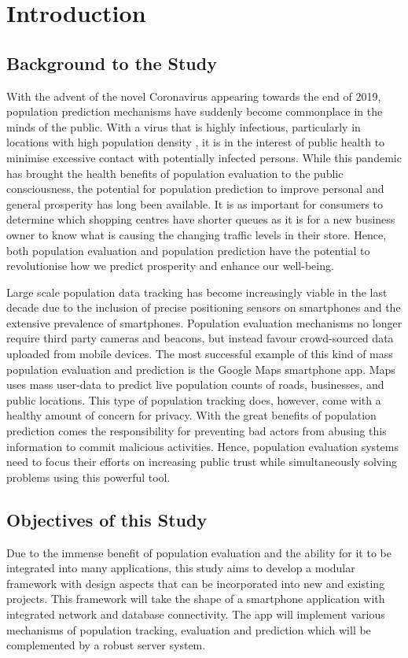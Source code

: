 \chapter{Introduction}

\section{Background to the Study}
With the advent of the novel Coronavirus appearing towards the end of 2019, population prediction mechanisms have suddenly become commonplace in the minds of the public. With a virus that is highly infectious, particularly in locations with high population density \cite{Carozzi2020}, it is in the interest of public health to minimise excessive contact with potentially infected persons. While this pandemic has brought the health benefits of population evaluation to the public consciousness, the potential for population prediction to improve personal and general prosperity has long been available. It is as important for consumers to determine which shopping centres have shorter queues as it is for a new business owner to know what is causing the changing traffic levels in their store. Hence, both population evaluation and population prediction have the potential to revolutionise how we predict prosperity and enhance our well-being. 

Large scale population data tracking has become increasingly viable in the last decade due to the inclusion of precise positioning sensors on smartphones and the extensive prevalence of smartphones. Population evaluation mechanisms no longer require third party cameras and beacons, but instead favour crowd-sourced data uploaded from mobile devices. The most successful example of this kind of mass population evaluation and prediction is the Google Maps smartphone app. Maps uses mass user-data to predict live population counts of roads, businesses, and public locations. This type of population tracking does, however, come with a healthy amount of concern for privacy. With the great benefits of population prediction comes the responsibility for preventing bad actors from abusing this information to commit malicious activities. Hence, population evaluation systems need to focus their efforts on increasing public trust while simultaneously solving problems using this powerful tool.

\section{Objectives of this Study}
Due to the immense benefit of population evaluation and the ability for it to be integrated into many applications, this study aims to develop a modular framework with design aspects that can be incorporated into new and existing projects. This framework will take the shape of a smartphone application with integrated network and database connectivity. The app will implement various mechanisms of population tracking, evaluation and prediction which will be complemented by a robust server system. 

